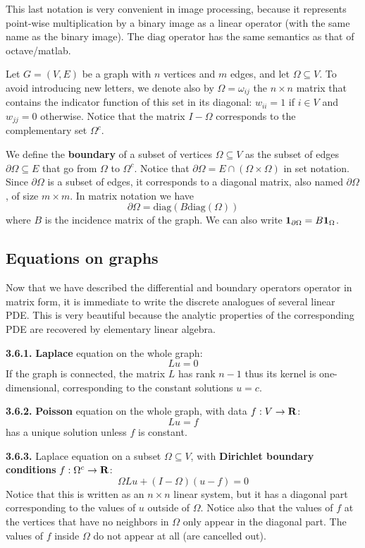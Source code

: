 This last notation is very convenient in image processing, because it
represents point-wise multiplication by a binary image as a linear operator
(with the same name as the binary image).  The $\mathrm{diag}$ operator has
the same semantics as that of octave/matlab.



Let $G=(V,E)$ be a graph with $n$ vertices and $m$ edges, and let
$\Omega\subseteq V$.
To avoid introducing new letters, we denote also by
$\Omega=\omega_{ij}$ the $n\times n$ matrix that contains the indicator
function of this set in its diagonal: $w_{ii}=1$ if $i\in V$ and $w_{jj}=0$
otherwise.
Notice that the matrix $I-\Omega$ corresponds to the
complementary set $\Omega^c$.



We define the {\bf boundary} of a subset of vertices $\Omega\subseteq V$ as
the subset of edges $\partial\Omega\subseteq E$ that go from $\Omega$ to
$\Omega^c$.  Notice that $\partial\Omega=E\cap(\Omega\times\Omega)$ in set
notation.  Since $\partial\Omega$ is a subset of edges, it corresponds to a
diagonal matrix, also named $\partial\Omega$, of size $m\times m$.
In matrix notation we have
\[\partial\Omega=\mathrm{diag}(B\mathrm{diag}(\Omega))\] where $B$ is the
incidence matrix of the graph.  We can also write
$\displaystyle\mathbf{1}_{\partial\Omega}=B\mathbf{1}_\Omega$.


\subsection{Equations on graphs}


Now that we have described the differential and boundary operators operator
in matrix form, it is immediate to write the discrete analogues of several
linear PDE.  This is very beautiful because the analytic properties of the
corresponding PDE are recovered by elementary linear algebra.



{\bf 3.6.1.}
{\bf Laplace} equation on the whole graph:
\[
Lu=0
\]
If the graph is connected, the matrix $L$ has rank $n-1$ thus its kernel is
one-dimensional, corresponding to the constant solutions $u=c$.



{\bf 3.6.2.}
{\bf Poisson} equation on the whole graph, with data $f:V\to\mathbf{R}$:
\[
Lu=f
\]
has a unique solution unless $f$ is constant.



{\bf 3.6.3.}
Laplace equation on a subset $\Omega\subseteq V$, with {\bf Dirichlet
boundary conditions}
$f:\Omega^c\to\mathbf{R}$:
\[
\Omega Lu + (I-\Omega)(u-f)=0
\]
Notice that this is written as an $n\times n$ linear system, but it has a
diagonal part corresponding to the values of $u$ outside of $\Omega$.
Notice also that the values of $f$ at the vertices that have no neighbors in
$\Omega$ only appear in the diagonal part.  The values of $f$ inside $\Omega$
do not appear at all (are cancelled out).



